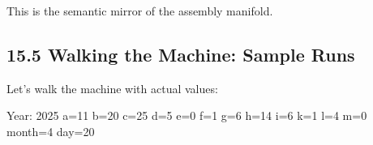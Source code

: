 \begin{Shaded}
\begin{Highlighting}[]
\NormalTok{\};}

    \NormalTok{;}
    \NormalTok{;}
    \NormalTok{;}
    \NormalTok{;}
    \NormalTok{;}
    \NormalTok{) / }\NormalTok{;}
    \NormalTok{) / }\NormalTok{;}
    \NormalTok{) \% }\NormalTok{;}
    \NormalTok{;}
    \NormalTok{;}
    \NormalTok{ + }\NormalTok{;}
    \NormalTok{;}
    \NormalTok{) / }\NormalTok{;}
    \NormalTok{) \% }\NormalTok{) + }\NormalTok{;}
\NormalTok{\}}
\end{Highlighting}
\end{Shaded}

This is the semantic mirror of the assembly manifold.

\hypertarget{walking-the-machine-sample-runs}{%
\subsection{15.5 Walking the Machine: Sample
Runs}\label{walking-the-machine-sample-runs}}

Let's walk the machine with actual values:

Year: 2025 a=11 b=20 c=25 d=5 e=0 f=1 g=6 h=14 i=6 k=1 l=4 m=0 month=4
day=20

